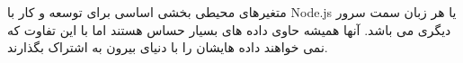 متغیرهای محیطی بخشی اساسی برای توسعه و کار با Node.js یا هر زبان سمت سرور دیگری می باشد. آنها همیشه حاوی داده های بسیار حساس هستند اما با این تفاوت که نمی خواهند داده هایشان را با دنیای بیرون به اشتراک بگذارند.